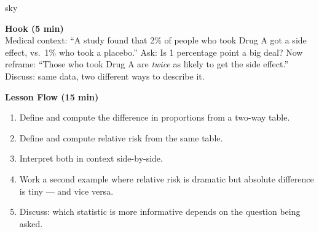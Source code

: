 \documentclass[10pt]{article}
\begin{document}
\begin{skillbox}{sky}
\begin{minipage}[t]{0.48\linewidth}
    \textbf{Hook (5 min)}\\
    Medical context: ``A study found that 2\% of people who took Drug A got a side effect, vs.\ 1\% who took a placebo.'' Ask: Is 1 percentage point a big deal? Now reframe: ``Those who took Drug A are \textit{twice} as likely to get the side effect.'' Discuss: same data, two different ways to describe it.
\end{minipage}
\hfill
\begin{minipage}[t]{0.48\linewidth}
    \textbf{Lesson Flow (15 min)}
    \begin{enumerate}
        \item Define and compute the difference in proportions from a two-way table.
        \item Define and compute relative risk from the same table.
        \item Interpret both in context side-by-side.
        \item Work a second example where relative risk is dramatic but absolute difference is tiny --- and vice versa.
        \item Discuss: which statistic is more informative depends on the question being asked.
    \end{enumerate}
\end{minipage}
\end{skillbox}
\end{document}
